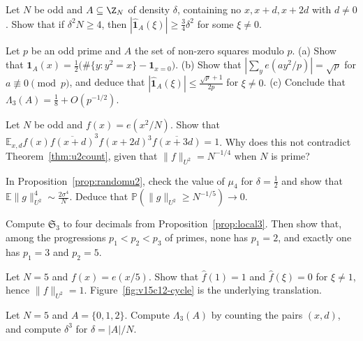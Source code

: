 \begin{exercise}[$\star$]\label{ex:noap}
Let $N$ be odd and $A\subseteq\Z_N$ of density $\delta$, containing no $x,x+d,x+2d$ with $d\ne0$. Show that if $\delta^2N\ge4$, then $|\hat{\mathbf 1}_A(\xi)|\ge\frac34\delta^2$ for some $\xi\ne0$.
\end{exercise}

\begin{exercise}[$\star\star$]\label{ex:qr}
Let $p$ be an odd prime and $A$ the set of non-zero squares modulo $p$. (a) Show that $\mathbf 1_A(x)=\frac12\bigl(\#\{y:y^2=x\}-\mathbf 1_{x=0}\bigr)$. (b) Show that $|\sum_ye(ay^2/p)|=\sqrt p$ for $a\not\equiv0\pmod p$, and deduce that $|\hat{\mathbf 1}_A(\xi)|\le\frac{\sqrt p+1}{2p}$ for $\xi\ne0$. (c) Conclude that $\Lambda_3(A)=\frac18+O(p^{-1/2})$.
\end{exercise}

\begin{exercise}[$\star\star$]\label{ex:fourterm}
Let $N$ be odd and $f(x)=e(x^2/N)$. Show that $\mathbb E_{x,d}f(x)\overline{f(x+d)}^3f(x+2d)^3\overline{f(x+3d)}=1$. Why does this not contradict Theorem~\ref{thm:u2count}, given that $\|f\|_{U^2}=N^{-1/4}$ when $N$ is prime?
\end{exercise}

\begin{exercise}[$\star$]\label{ex:randommu4}
In Proposition~\ref{prop:randomu2}, check the value of $\mu_4$ for $\delta=\frac12$ and show that $\mathbb E\|g\|_{U^2}^4\sim\frac{2\sigma^4}N$. Deduce that $\mathbb P(\|g\|_{U^2}\ge N^{-1/5})\to0$.
\end{exercise}

\begin{exercise}[$\star$]\label{ex:singular3}
Compute $\mathfrak S_3$ to four decimals from Proposition~\ref{prop:local3}. Then show that, among the progressions $p_1<p_2<p_3$ of primes, none has $p_1=2$, and exactly one has $p_1=3$ and $p_2=5$.
\end{exercise}

\begin{exercise}[$\star$]\label{ex:v15-12-1}
Let \(N=5\) and \(f(x)=e(x/5)\). Show that \(\hat f(1)=1\) and \(\hat f(\xi)=0\) for \(\xi\ne1\), hence \(\|f\|_{U^2}=1\). Figure~\ref{fig:v15c12-cycle} is the underlying translation.
\end{exercise}

\begin{exercise}[$\star$]\label{ex:v15-12-2}
Let \(N=5\) and \(A=\{0,1,2\}\). Compute \(\Lambda_3(A)\) by counting the pairs \((x,d)\), and compute \(\delta^3\) for \(\delta=|A|/N\).
\end{exercise}

